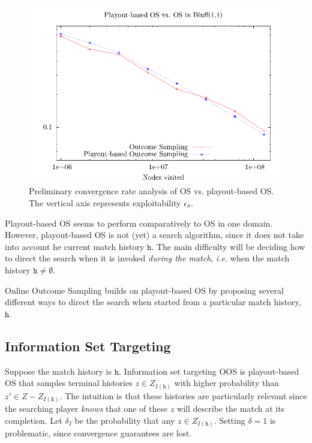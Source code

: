 \documentclass[letterpaper]{article}
\newcommand{\tth}{\mathtt{h}}
\newcommand{\ie}{{\it i.e.}\xspace}
\begin{document}
\begin{figure}
\hspace{-0.2cm}\includegraphics[scale=0.7]{figs/first-pbos/os-vs-pbos}
\caption{Preliminary convergence rate analysis of OS vs. playout-based OS. The vertical axis represents exploitability $\epsilon_{\bar{\sigma}}$.
\label{fig:os-vs-pbos}} 
\end{figure}

Playout-based OS seems to perform comparatively to OS in one domain. However, playout-based OS is not (yet) a search algorithm, 
since it does not take into account he current match history $\tth$. 
The main difficulty will be deciding how to direct the search when it is invoked {\it during the match}, \ie when the match 
history $\tth \not= \emptyset$. 

Online Outcome Sampling builds on playout-based OS by proposing several different ways to direct the search when started from a particular
match history, $\tth$. 

\subsection{Information Set Targeting}

Suppose the match history is $\tth$. Information set targeting OOS is playout-based OS that samples terminal histories $z \in Z_{I(\tth)}$ 
with higher probability than $z' \in Z - Z_{I(\tth)}$. The intuition is that these histories are particularly relevant since the searching player 
{\it knows} that one of these $z$ will describe the match at its completion. Let $\delta_I$ be the probability that any $z \in Z_{I(\tth)}$. 
Setting $\delta = 1$ is problematic, since convergence guarantees are lost.
\end{document}
